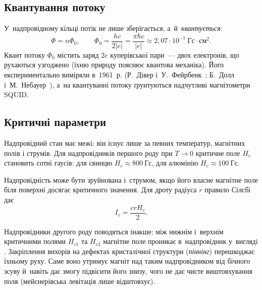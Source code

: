\subsection*{Квантування потоку}

У~надпровідному кільці потік не лише зберігається, а~й~\emph{квантується}:
\begin{equation*}
	\Phi=n\Phi_0, \qquad \Phi_0=\frac{hc}{2|e|}=\frac{\pi\hbar c}{|e|}
	\approx2{,}07\cdot10^{-7}~\mathrm{Гс}\cdot\mathrm{см}^2.
\end{equation*}
Квант потоку $\Phi_0$ містить заряд $2e$ куперівської пари~--- двох електронів, що рухаються узгоджено (їхню природу пояснює квантова механіка). Його експериментально
виміряли в~1961~р. (Р.~Дівер і~У.~Фейрбенк~\cite{DeaverFairbank1961}; Б.~Долл і~М.~Небауер~\cite{DollNabauer1961}), а~на квантуванні потоку
ґрунтуються надчутливі магнітометри SQUID.

\subsection*{Критичні параметри}


Надпровідний стан має межі: він існує лише за певних температур, магнітних полів і
струмів. Для надпровідників першого роду при $T\to0$ критичне поле $H_c$ становить
сотні гаусів: для свинцю $H_c\approx800~\mathrm{Гс}$, для алюмінію
$H_c\approx100~\mathrm{Гс}$.

Надпровідність може бути зруйнована і~струмом, якщо його власне магнітне поле біля
поверхні досягає критичного значення. Для дроту радіуса $r$ правило Сілсбі дає
\begin{equation*}
	I_c=\frac{crH_c}{2}.
\end{equation*}

Надпровідники другого роду поводяться інакше: між нижнім і~верхнім критичними полями
$H_{c1}$ та $H_{c2}$ магнітне поле проникає в~надпровідник у~вигляді
. Закріплення вихорів на дефектах кристалічної структури
(\emph{піннінг}) перешкоджає їхньому руху. Саме воно утримує магніт над таким надпровідником від бічного зсуву й~навіть дає змогу підвісити його
знизу, чого не дає чисте виштовхування поля (мейснерівська левітація лише відштовхує).

